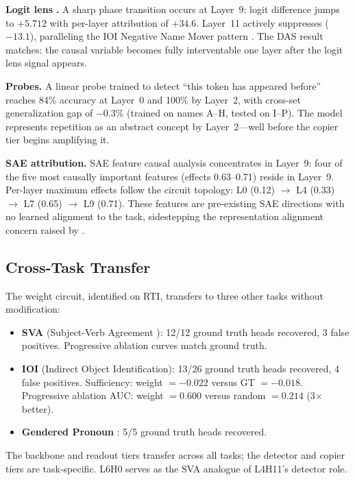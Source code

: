 \documentclass{article}
\begin{document}
\textbf{Logit lens} \citep{nostalgebraist2020logitlens}\textbf{.}
A sharp phase transition occurs at Layer~9: logit
difference jumps to $+5.712$ with per-layer attribution of $+34.6$.
Layer~11 actively suppresses ($-13.1$), paralleling the IOI Negative
Name Mover pattern \citep{wang2023ioi}. The DAS result matches: the
causal variable becomes fully interventable one layer after the logit
lens signal appears.

\textbf{Probes.}
A linear probe trained to detect ``this token has appeared before''
reaches 84\% accuracy at Layer~0 and 100\% by Layer~2, with
cross-set generalization gap of $-0.3\%$ (trained on names A--H,
tested on I--P). The model represents repetition as an abstract
concept by Layer~2---well before the copier tier begins amplifying it.

\textbf{SAE attribution.}
SAE feature causal analysis concentrates in Layer~9: four of the five
most causally important features (effects 0.63--0.71) reside in Layer~9.
Per-layer maximum effects follow the circuit topology:
L0 (0.12) $\to$ L4 (0.33) $\to$ L7 (0.65) $\to$ L9 (0.71). These
features are pre-existing SAE directions with no learned alignment to
the task, sidestepping the representation alignment concern raised by
\citet{sutter2025alignment}.

\subsection{Cross-Task Transfer}

The weight circuit, identified on RTI, transfers to three other tasks
without modification:

\begin{itemize}[itemsep=2pt]
\item \textbf{SVA} (Subject-Verb Agreement \citep{lazo2025sva}): 12/12
  ground truth heads recovered, 3 false positives. Progressive ablation
  curves match ground truth.
\item \textbf{IOI} (Indirect Object Identification): 13/26 ground truth
  heads recovered, 4 false positives. Sufficiency: weight $= -0.022$
  versus GT $= -0.018$. Progressive ablation AUC: weight $= 0.600$
  versus random $= 0.214$ (3$\times$ better).
\item \textbf{Gendered Pronoun} \citep{mathwin2023gp}: 5/5 ground truth
  heads recovered.
\end{itemize}

The backbone and readout tiers transfer across all tasks; the detector
and copier tiers are task-specific. L6H0 serves as the SVA analogue of
L4H11's detector role.
\end{document}
